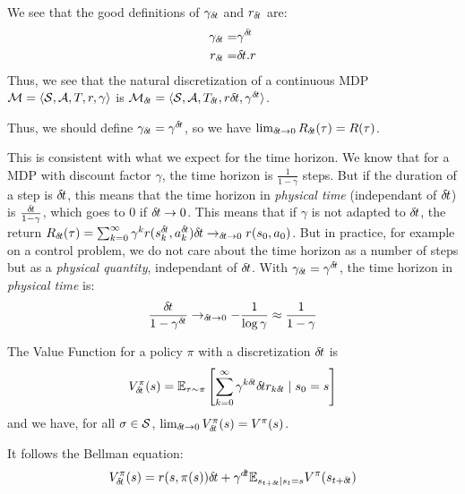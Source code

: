 We see that the good  definitions of $\gamma_{\delta\hspace{-.1em}t}$ and $r_{\delta\hspace{-.1em}t}$ are:
\begin{align}
  \gamma_{\delta\hspace{-.1em}t} =& \gamma^{\delta\hspace{-.1em}t}\\
  r_{\delta\hspace{-.1em}t} =& {\delta\hspace{-.1em}t} . r
\end{align}
Thus, we see that the natural discretization of a continuous MDP ${\cal M} = \langle {\cal S}, {\cal A}, T, r, \gamma\rangle$ is ${\cal M}_{\delta\hspace{-.1em}t} = \langle {\cal S}, {\cal A}, T_{\delta\hspace{-.1em}t}, r{\delta\hspace{-.1em}t}, \gamma^{\delta\hspace{-.1em}t}\rangle$.

Thus, we should define $\gamma_{\delta\hspace{-.1em}t} = \gamma^{\delta\hspace{-.1em}t}$, so we have $\lim_{{\delta\hspace{-.1em}t} \rightarrow 0} R_{\delta\hspace{-.1em}t}(\tau)  = R(\tau)$. 


This is consistent with what we expect for the time horizon. We know  that for a MDP with discount factor $\gamma$, the time horizon is $\frac{1}{1-\gamma}$ steps. But if the duration of a step is ${\delta\hspace{-.1em}t}$, this means that the time horizon in \emph{physical time} (independant of ${\delta\hspace{-.1em}t}$) is $\frac{{\delta\hspace{-.1em}t}}{1-\gamma}$, which goes to 0 if ${\delta\hspace{-.1em}t} \rightarrow 0$. This means that if $\gamma$ is not adapted to ${\delta\hspace{-.1em}t}$, the return $R_{\delta\hspace{-.1em}t}(\tau) = \sum_{k=0}^\infty\gamma^{k}r(s^{\delta\hspace{-.1em}t}_k, a^{\delta\hspace{-.1em}t}_k){\delta\hspace{-.1em}t} \rightarrow_{{\delta\hspace{-.1em}t}\rightarrow 0} r(s_0, a_0)$.  But in practice, for example on a control problem, we do not care about the time horizon as a number of steps but as a \emph{physical quantity}, independant of ${\delta\hspace{-.1em}t}$. With $\gamma_{\delta\hspace{-.1em}t} = \gamma^{\delta\hspace{-.1em}t}$, the time horizon in \emph{physical time} is:
\begin{equation}
  \label{eq:time-horizon}
  \frac{{\delta\hspace{-.1em}t}}{1-\gamma^{\delta\hspace{-.1em}t}} \rightarrow_{{\delta\hspace{-.1em}t} \rightarrow 0} - \frac{1}{\log \gamma} \approx \frac{1}{1-\gamma}
\end{equation}



The Value Function for a policy $\pi$ with a discretization ${\delta\hspace{-.1em}t}$ is
\begin{equation}
  V^\pi_{\delta\hspace{-.1em}t}(s) = \mathbb{E}_{\tau\sim\pi}\left[\sum\limits_{k=0}^\infty \gamma^{k{\delta\hspace{-.1em}t}}{\delta\hspace{-.1em}t} r_{k{\delta\hspace{-.1em}t}} \mid s_0 = s\right]
\end{equation}
and we have, for all $\sigma \in {\cal S}$, $\lim_{{\delta\hspace{-.1em}t} \rightarrow 0} V^\pi_{\delta\hspace{-.1em}t}(s) = V^\pi(s)$. 

It follows the Bellman equation:
\begin{equation}
  \label{eq:bellman}
  V^\pi_{\delta\hspace{-.1em}t}(s) = {r}(s, \pi(s)){\delta\hspace{-.1em}t} + \gamma^{d\hspace{-.1em}t} \mathbb{E}_{s_{t+{\delta\hspace{-.1em}t}} | s_t = s} V^\pi(s_{t+{\delta\hspace{-.1em}t}})
\end{equation}

